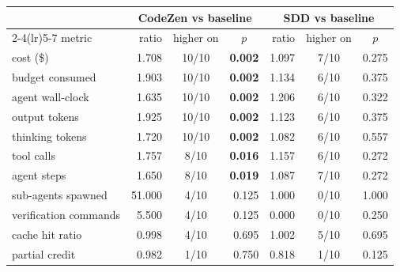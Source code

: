 
\begin{tabular}{@{}lrcrrcr@{}}
\toprule
 & \multicolumn{3}{c}{CodeZen vs baseline} & \multicolumn{3}{c}{SDD vs baseline} \\
\cmidrule(lr){2-4}\cmidrule(lr){5-7}
metric & ratio & higher on & \multicolumn{1}{c}{$p$} & ratio & higher on & \multicolumn{1}{c}{$p$} \\
\midrule
cost (\$) & 1.708 & 10/10 & \textbf{0.002} & 1.097 & 7/10 & 0.275 \\
budget consumed & 1.903 & 10/10 & \textbf{0.002} & 1.134 & 6/10 & 0.375 \\
agent wall-clock & 1.635 & 10/10 & \textbf{0.002} & 1.206 & 6/10 & 0.322 \\
output tokens & 1.925 & 10/10 & \textbf{0.002} & 1.123 & 6/10 & 0.375 \\
thinking tokens & 1.720 & 10/10 & \textbf{0.002} & 1.082 & 6/10 & 0.557 \\
tool calls & 1.757 & 8/10 & \textbf{0.016} & 1.157 & 6/10 & 0.272 \\
agent steps & 1.650 & 8/10 & \textbf{0.019} & 1.087 & 7/10 & 0.272 \\
sub-agents spawned & 51.000 & 4/10 & 0.125 & 1.000 & 0/10 & 1.000 \\
verification commands & 5.500 & 4/10 & 0.125 & 0.000 & 0/10 & 0.250 \\
cache hit ratio & 0.998 & 4/10 & 0.695 & 1.002 & 5/10 & 0.695 \\
partial credit & 0.982 & 1/10 & 0.750 & 0.818 & 1/10 & 0.125 \\
\bottomrule
\end{tabular}
